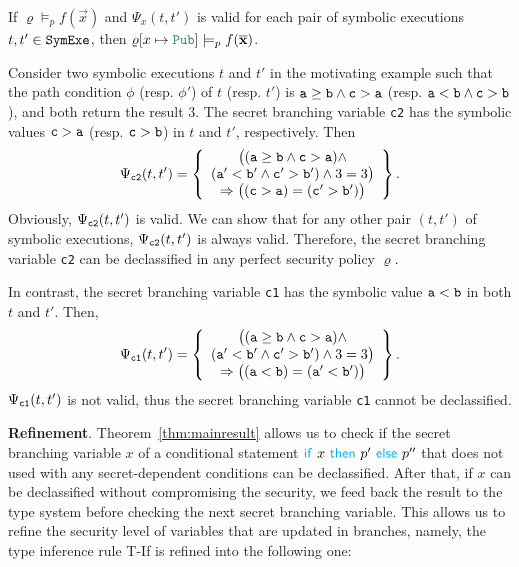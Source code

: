 \begin{theorem}\label{thm:mainresult}
If $\varrho\models_p f(\vec{x})$ and $\Psi_x(t,t')$ is valid for each pair of symbolic executions $t,t'\in{\tt SymExe}$,  %
then $\varrho[x\mapsto \Pub]\models_p f(\vec{x})$.
\end{theorem}

\begin{example}
Consider two symbolic executions $t$ and $t'$ in the motivating example
such that the path condition $\phi$ (resp. $\phi'$) of $t$ (resp. $t'$)
is ${\tt a}\geq{\tt b}\wedge {\tt c}>{\tt a}$ (resp. ${\tt a}<{\tt b}\wedge {\tt c}>{\tt b}$),
and both return the result 3.
The secret branching variable {\tt c2} has the symbolic values ${\tt c}>{\tt a}$ (resp. ${\tt c}>{\tt b}$)
in $t$ and $t'$, respectively.
Then
\[\Psi_{\tt c2}(t,t')=\left\{\begin{array}{c}
  \big(({\tt a}\geq{\tt b}\wedge {\tt c}>{\tt a})\wedge\\
  ({\tt a}'<{\tt b}'\wedge {\tt c}'>{\tt b}')\wedge 3 =3\big)\\ \Rightarrow
  \big(({\tt c}>{\tt a})= ({\tt c}'>{\tt b}')\big)\\
\end{array}\right\}.\]
Obviously, $\Psi_{\tt c2}(t,t')$ is valid.
We can show that for any other pair $(t,t')$ of symbolic executions,
$\Psi_{\tt c2}(t,t')$ is always valid.
Therefore, the secret branching variable {\tt c2} can be declassified in any perfect security policy $\varrho$.

In contrast, the secret branching variable {\tt c1} has the symbolic value ${\tt a}<{\tt b}$
in both $t$ and $t'$. Then,
\[\Psi_{\tt c1}(t,t')=\left\{\begin{array}{c}
  \big(({\tt a}\geq{\tt b}\wedge {\tt c}>{\tt a})\wedge\\
  ({\tt a}'<{\tt b}'\wedge {\tt c}'>{\tt b}')\wedge 3 =3\big)\\ \Rightarrow
  \big(({\tt a}<{\tt b})= ({\tt a}'<{\tt b}')\big)\\
\end{array}\right\}.\]
$\Psi_{\tt c1}(t,t')$ is not valid, thus the secret branching variable {\tt c1} cannot be declassified.
\end{example}

\noindent
{\bf Refinement}.
Theorem~\ref{thm:mainresult} allows us to
check if the secret branching variable $x$ of a conditional statement ${\Pif} \ x \ {\Pthen} \  p' \ {\Pelse} \ p''$ that does not used with
any secret-dependent conditions can be declassified.
%
After that, if $x$ can be declassified without compromising the security,
we feed back the result to the type system before checking the next secret branching variable.
This allows us to refine the security level of variables that are updated in branches, namely,
the type inference rule {\sc T-If} is refined into the following one:

